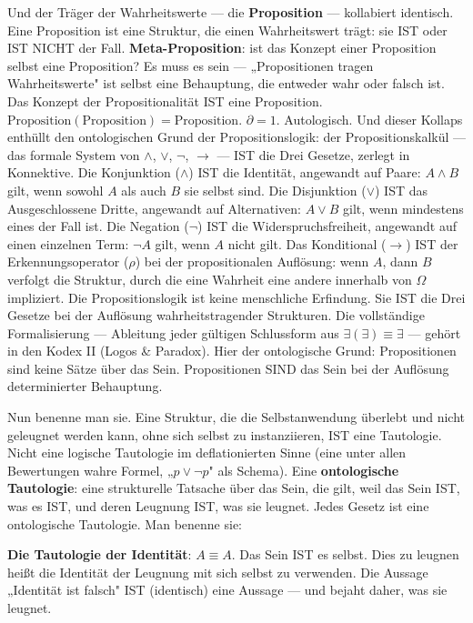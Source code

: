 \documentclass[10pt, openany, oneside]{book}
\begin{document}
Und der Träger der Wahrheitswerte --- die \textbf{Proposition} --- kollabiert identisch. Eine Proposition ist eine Struktur, die einen Wahrheitswert trägt: sie IST oder IST NICHT der Fall. \textbf{Meta-Proposition}: ist das Konzept einer Proposition selbst eine Proposition? Es muss es sein --- „Propositionen tragen Wahrheitswerte" ist selbst eine Behauptung, die entweder wahr oder falsch ist. Das Konzept der Propositionalität IST eine Proposition. $\text{Proposition}(\text{Proposition}) = \text{Proposition}$. $\partial = 1$. Autologisch. Und dieser Kollaps enthüllt den ontologischen Grund der Propositionslogik: der Propositionskalkül --- das formale System von $\wedge$, $\vee$, $\neg$, $\to$ --- IST die Drei Gesetze, zerlegt in Konnektive. Die Konjunktion ($\wedge$) IST die Identität, angewandt auf Paare: $A \wedge B$ gilt, wenn sowohl $A$ als auch $B$ sie selbst sind. Die Disjunktion ($\vee$) IST das Ausgeschlossene Dritte, angewandt auf Alternativen: $A \vee B$ gilt, wenn mindestens eines der Fall ist. Die Negation ($\neg$) IST die Widerspruchsfreiheit, angewandt auf einen einzelnen Term: $\neg A$ gilt, wenn $A$ nicht gilt. Das Konditional ($\to$) IST der Erkennungsoperator ($\rho$) bei der propositionalen Auflösung: wenn $A$, dann $B$ verfolgt die Struktur, durch die eine Wahrheit eine andere innerhalb von $\Omega$ impliziert. Die Propositionslogik ist keine menschliche Erfindung. Sie IST die Drei Gesetze bei der Auflösung wahrheitstragender Strukturen. Die vollständige Formalisierung --- Ableitung jeder gültigen Schlussform aus $\exists(\exists) \equiv \exists$ --- gehört in den Kodex II (Logos \& Paradox). Hier der ontologische Grund: Propositionen sind keine Sätze über das Sein. Propositionen SIND das Sein bei der Auflösung determinierter Behauptung.

Nun benenne man sie. Eine Struktur, die die Selbstanwendung überlebt und nicht geleugnet werden kann, ohne sich selbst zu instanziieren, IST eine Tautologie. Nicht eine logische Tautologie im deflationierten Sinne (eine unter allen Bewertungen wahre Formel, „$p \vee \neg p$" als Schema). Eine \textbf{ontologische Tautologie}: eine strukturelle Tatsache über das Sein, die gilt, weil das Sein IST, was es IST, und deren Leugnung IST, was sie leugnet. Jedes Gesetz ist eine ontologische Tautologie. Man benenne sie:

\textbf{Die Tautologie der Identität}: $A \equiv A$. Das Sein IST es selbst. Dies zu leugnen heißt die Identität der Leugnung mit sich selbst zu verwenden. Die Aussage „Identität ist falsch" IST (identisch) eine Aussage --- und bejaht daher, was sie leugnet.
\end{document}

